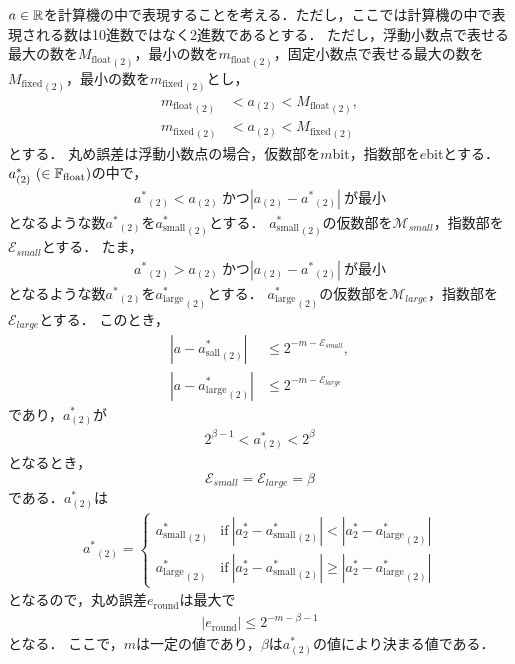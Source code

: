 $a \in \mathbb{R}$を計算機の中で表現することを考える．ただし，ここでは計算機の中で表現される数は10進数ではなく2進数であるとする．
ただし，浮動小数点で表せる最大の数を${M_{\mathrm{float}}}_{(2)}$，最小の数を${m_{\mathrm{float}}}_{(2)}$，固定小数点で表せる最大の数を${M_{\mathrm{fixed}}}_{(2)}$，最小の数を${m_{\mathrm{fixed}}}_{(2)}$とし，
\begin{align}
   {m_{\mathrm{float}}}_{(2)} &< a_{(2)} < {M_{\mathrm{float}}}_{(2)}, \\
   {m_{\mathrm{fixed}}}_{(2)} &< a_{(2)} < {M_{\mathrm{fixed}}}_{(2)}
\end{align}
とする．
丸め誤差は浮動小数点の場合，仮数部を$m$bit，指数部を$e$bitとする．
$a^{\ast}_{(2)} \ (\in \mathbb{F}_{\text{float}})$の中で，
\begin{align}
    {a^{\ast}}_{(2)} < a_{(2)}\ \text{かつ} |a_{(2)} - {a^{\ast}}_{(2)}| \ \text{が最小}
\end{align}
となるような数${a^{\ast}}_{(2)}$を${a^{\ast}_{\mathrm{small}}}_{(2)}$とする．
${a^{\ast}_{\mathrm{small}}}_{(2)}$の仮数部を$\mathcal{M}_{small}$，指数部を$\mathcal{E}_{small}$とする．
たま，
\begin{align}
    {a^{\ast}}_{(2)} > a_{(2)} \ \text{かつ} |a_{(2)} - {a^{\ast}}_{(2)}| \ \text{が最小}
\end{align}
となるような数${a^{\ast}}_{(2)}$を${a^{\ast}_{\mathrm{large}}}_{(2)}$とする．
${a^{\ast}_{\mathrm{large}}}_{(2)}$の仮数部を$\mathcal{M}_{large}$，指数部を$\mathcal{E}_{large}$とする．
このとき，
\begin{align}
    |a - {a^{\ast}_{\mathrm{sall}}}_{(2)}| &\leq 2^{-m-{\mathcal{E}_{small}}}, \\
    |a - {a^{\ast}_{\mathrm{large}}}_{(2)}| &\leq 2^{-m-{\mathcal{E}_{large}}}
\end{align}
であり，$a^{\ast}_{(2)}$が
\begin{align}
    2^{\beta -1} < a^{\ast}_{(2)} < 2^{\beta}
\end{align}
となるとき，
\begin{equation}
    \mathcal{E}_{small} = \mathcal{E}_{large} = \beta
\end{equation}
である．$a^{\ast}_{(2)}$は
\begin{align}
    {a^{\ast}}_{(2)} = \left\{ 
        \begin{array}{ll}
            {a^{\ast}_{\mathrm{small}}}_{(2)} &\text{if} \ |a^{\ast}_{2} - {a^{\ast}_{\mathrm{small}}}_{(2)} | < |a^{\ast}_{2} - {a^{\ast}_{\mathrm{large}}}_{(2)} | \\
            {a^{\ast}_{\mathrm{large}}}_{(2)} &\text{if} \ |a^{\ast}_{2} - {a^{\ast}_{\mathrm{small}}}_{(2)} | \geq |a^{\ast}_{2} - {a^{\ast}_{\mathrm{large}}}_{(2)} | 
        \end{array}
    \right.
\end{align}
となるので，丸め誤差$e_{\mathrm{round}}$は最大で
\begin{align}
    \label{eq:rounderror_float}
    |e_{\mathrm{round}}| \leq 2^{-m-\beta -1}
\end{align}
となる．
ここで，$m$は一定の値であり，$\beta$は$a^{\ast}_{(2)}$の値により決まる値である．


